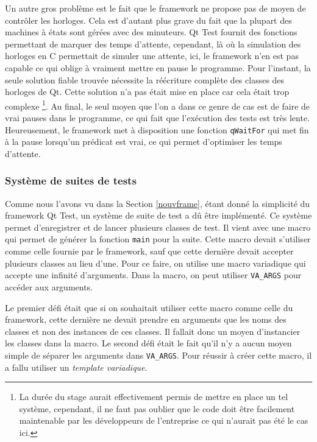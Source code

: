 \documentclass[a4paper]{article}
\begin{document}
Un autre gros problème est le fait que le framework ne propose pas de moyen de
contrôler les horloges. Cela est d'autant plus grave du fait que la plupart des
machines à états sont gérées avec des minuteurs. Qt Test fournit des fonctions
permettant de marquer des temps d'attente, cependant, là où la simulation des
horloges en C permettait de simuler une attente, ici, le framework n'en est pas
capable ce qui oblige à vraiment mettre en pause le programme. Pour l'instant,
la seule solution fiable trouvée nécessite la réécriture complète des classes
des horloges de Qt. Cette solution n'a pas était mise en place car cela était
trop complexe \footnote{La durée du stage aurait effectivement permis de mettre
en place un tel système, cependant, il ne faut pas oublier que le code doit être
facilement maintenable par les développeurs de l'entreprise ce qui n'aurait pas
été le cas ici.}. Au final, le seul moyen que l'on a dans ce genre de cas est de
faire de vrai pauses dans le programme, ce qui fait que l'exécution des tests
est très lente. Heureusement, le framework met à disposition une fonction
\verb|qWaitFor| qui met fin à la pause lorsqu'un prédicat est vrai, ce qui
permet d'optimiser les temps d'attente.

\subsubsection*{Système de suites de tests}

Comme nous l'avons vu dans la Section \ref{nouvframe}, étant donné la simplicité
du framework Qt Test, un système de suite de test a dû être implémenté. Ce
système permet d'enregistrer et de lancer plusieurs classes de test. Il vient
avec une macro qui permet de générer la fonction \verb|main| pour la suite.
Cette macro devait s'utiliser comme celle fournie par le framework, sauf que
cette dernière devait accepter plusieurs classes au lieu d'une. Pour ce faire, on
utilise une macro variadique qui accepte une infinité d'arguments. Dans la
macro, on peut utiliser \verb|VA_ARGS| pour accéder aux arguments.

Le premier défi était que si on souhaitait utiliser cette macro comme celle du
framework, cette dernière ne devait prendre en arguments que les noms des
classes et non des instances de ces classes. Il fallait donc un moyen
d'instancier les classes dans la macro. Le second défi était le fait qu'il n'y a
aucun moyen simple de séparer les arguments dans \verb|VA_ARGS|. Pour réussir à
créer cette macro, il a fallu utiliser un \textit{template variadique}.
\end{document}
